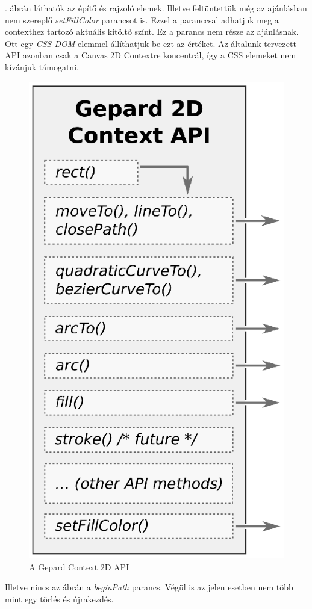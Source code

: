 \documentclass[12pt]{report}
\theoremstyle{definition}
\begin{document}
. ábrán láthatók az építő és rajzoló
elemek. Illetve feltüntettük még az ajánlásban nem szereplő
\emph{setFillColor} parancsot is. Ezzel a paranccsal adhatjuk meg a
contexthez tartozó aktuális kitöltő színt. Ez a parancs nem része
az ajánlásnak. Ott egy \emph{CSS DOM} elemmel állíthatjuk be ezt
az értéket. Az általunk tervezett API azonban csak a Canvas 2D
Contextre koncentrál, így a CSS elemeket nem kívánjuk támogatni.
    \begin{figure}
    \begin{center}
      \includegraphics[scale=0.6]{dataflow_canvas_api.eps}
    \end{center}
      \caption{\label{dataflow-canvas-API-diagram}
      A Gepard Context 2D API}
    \end{figure}
Illetve nincs az ábrán a \emph{beginPath} parancs. Végül is az
jelen esetben nem több mint egy törlés és újrakezdés.
\end{document}
